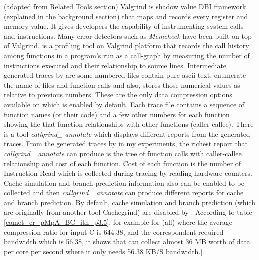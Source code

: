(adapted from Related Tools section)
Valgrind is shadow value DBI framework (explained in the background section) that maps and records every register and memory value. It gives developers the capability of instrumenting system calls and instructions. Many error detectors such as \textit{Memcheck} have been built on top of Valgrind. \callgrind is a profiling tool  on Valgrind platform that records the call history among functions in a program's run as a call-graph by measuring the number of instructions executed and their relationship to source lines. 
Intermediate generated traces by \callgrind are some numbered files contain pure ascii text. \callgrind enumerate the name of files and function calls and also, stores those numerical values as relative to previous numbers. These are the only data compression options available on \callgrind which is enabled by default. Each \callgrind trace file contains a sequence of function names (or their code) and a few other numbers for each function showing the that function relationships with other functions (caller-callee). There is a tool \textit{callgrind\_ annotate} which displays different reports from the generated traces. From the generated traces by \callgrind in my experiments, the richest report that \textit{callgrind\_ annotate} can produce is the tree of function calls with caller-callee relationship and cost of each function. Cost of each function is the number of Instruction Read which is collected during tracing by reading hardware counters. Cache simulation and branch prediction information also can be enabled to be collected and then \textit{callgrind\_ annotate} can produce different reports for cache and branch prediction. By default, cache simulation and branch prediction (which are originally from another tool Cachegrind) are disabled by \callgrind.
According to table \ref{comet_cr_pMpA_BC_itn_p3.5}, for example for \parlot(all) where the average compression ratio for input C is 644.38, and the correspondent required bandwidth which is 56.38, it shows that \parlot can collect almost 36 MB worth of data per core per second where it only needs 56.38 KB/S bandwidth.] \\




